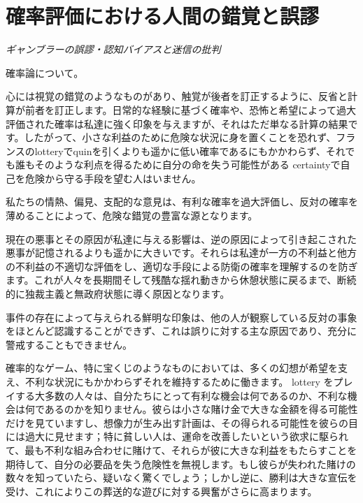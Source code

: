 \documentclass[a4paper,11pt,openany]{ltjsbook}
\begin{document}
\newpage

\chapter{確率評価における人間の錯覚と誤謬}
\label{ch:xvi}

\begin{center}
\large\textit{ギャンブラーの誤謬・認知バイアスと迷信の批判}
\end{center}
\vspace{4mm}

確率論について。

心には視覚の錯覚のようなものがあり、触覚が後者を訂正するように、反省と計算が前者を訂正します。日常的な経験に基づく確率や、恐怖と希望によって過大評価された確率は私達に強く印象を与えますが、それはただ単なる計算の結果です。したがって、小さな利益のために危険な状況に身を置くことを恐れず、フランスのlotteryでquinを引くよりも遥かに低い確率であるにもかかわらず、それでも誰もそのような利点を得るために自分の命を失う可能性がある certaintyで自己を危険から守る手段を望む人はいません。

私たちの情熱、偏見、支配的な意見は、有利な確率を過大評価し、反対の確率を薄めることによって、危険な錯覚の豊富な源となります。

現在の悪事とその原因が私達に与える影響は、逆の原因によって引き起こされた悪事が記憶されるよりも遥かに大きいです。それらは私達が一方の不利益と他方の不利益の不適切な評価をし、適切な手段による防衛の確率を理解するのを防ぎます。これが人々を長期間そして残酷な揺れ動きから休憩状態に戻るまで、断続的に独裁主義と無政府状態に導く原因となります。

事件の存在によって与えられる鮮明な印象は、他の人が観察している反対の事象をほとんど認識することができず、これは誤りに対する主な原因であり、充分に警戒することもできません。

確率的なゲーム、特に宝くじのようなものにおいては、多くの幻想が希望を支え、不利な状況にもかかわらずそれを維持するために働きます。 lottery をプレイする大多数の人々は、自分たちにとって有利な機会は何であるのか、不利な機会は何であるのかを知りません。彼らは小さな賭け金で大きな金額を得る可能性だけを見ていますし、想像力が生み出す計画は、その得られる可能性を彼らの目には過大に見せます；特に貧しい人は、運命を改善したいという欲求に駆られて、最も不利な組み合わせに賭けて、それらが彼に大きな利益をもたらすことを期待して、自分の必要品を失う危険性を無視します。もし彼らが失われた賭けの数々を知っていたら、疑いなく驚くでしょう；しかし逆に、勝利は大きな宣伝を受け、これによりこの葬送的な遊びに対する興奮がさらに高まります。
\end{document}
